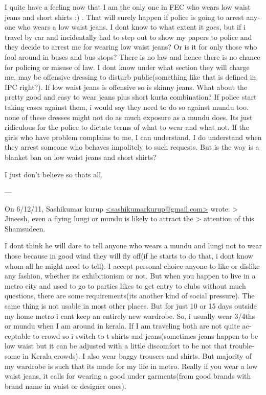 \begin{english}
I quite have a feeling now that I am the only one in FEC who wears low
waist jeans and short shirts :) .
That will surely happen if police is going to arrest anyone who wears
a low waist jeans. I dont know to what extent it goes, but if i travel
by car and incidentally had to step out to show my papers to police
and they decide to arrest me for wearing low waist jeans? Or is it for
only those who fool around in buses and bus stops? There is no law and
hence there is no chance for policing or misuse of law. I dont know
under what section they will charge me, may be offensive dressing to
disturb public(something like that is defined in IPC right?). If low
waist jeans is offensive so is skinny jeans. What about the pretty
good and easy to wear jeans plus short kurta combination? If police
start taking cases against them, i would say they need to do so
against mundu too. none of these dresses might not do as much exposure
as a mundu does. Its just ridiculous for the police to dictate terms
of what to wear and what not. If the girls who have problem complains
to me, I can understand. I do understand when they arrest someone who
behaves impolitely to such requests. But is the way is a blanket ban
on low waist jeans and short shirts?

I just don't believe so thats all.

---

On 6/12/11, Sashikumar kurup \url{<sashikumarkurup@gmail.com>} wrote:
> Jineesh, even a flying lungi or mundu is likely to attract the
> attention of this Shamsudeen.

I dont think he will dare to tell anyone who wears a mundu and lungi
not to wear those because in good wind they will fly off(if he starts
to do that, i dont know whom all he might need to tell).
I accept personal choice anyone to like or dislike any fashion,
whether its exhibitionism or not. But when you happen to live in a
metro city and used to go to parties likes to get entry to clubs
without much questions, there are some requirements(its another kind
of social pressure). The same thing is not usable in most other
places. But for just 10 or 15 days outside my home metro i cant keep
an entirely new wardrobe. So, i usually wear 3/4ths or mundu when I am
around in kerala. If I am traveling both are not quite acceptable to
crowd so i switch to t shirts and jeans(sometimes jeans happen to be
low waist but it can be adjusted with a little discomfort to be not
that troublesome in Kerala crowds). I also wear baggy trousers and
shirts. But majority of my wardrobe is such that its made for my life
in metro. Really if you wear a low waist jeans, it calls for wearing a
good under garments(from good brands with brand name in waist or
designer ones).


\end{english}
